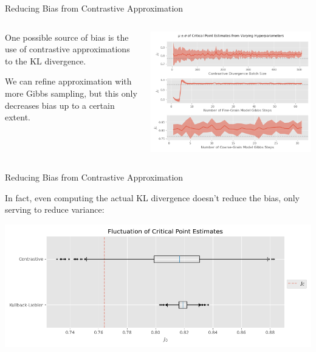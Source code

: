 \documentclass[aspectratio=169, 12pt]{beamer}
\begin{document}
\begin{frame}{Reducing Bias from Contrastive Approximation}

    \begin{columns}
        \begin{column}{.4\textwidth}
            
            One possible source of bias is the use of contrastive approximations to the KL divergence. 

            \vspace{1em}
        
            We can refine approximation with more Gibbs sampling, but this only decreases bias up to a certain extent. 
            
        \end{column}
        \begin{column}{.6\textwidth}
            \includegraphics[width=\textwidth]{images/cd-hyperparameters.png}
        \end{column}
    \end{columns}

\end{frame}

\begin{frame}{Reducing Bias from Contrastive Approximation}

    In fact, even computing the actual KL divergence doesn't reduce the bias, only serving to reduce variance:

    \begin{center}
        \includegraphics[width=\textwidth]{images/a1_critical_points_divergence_boxplot.png}
    \end{center}

\end{frame}
\end{document}
